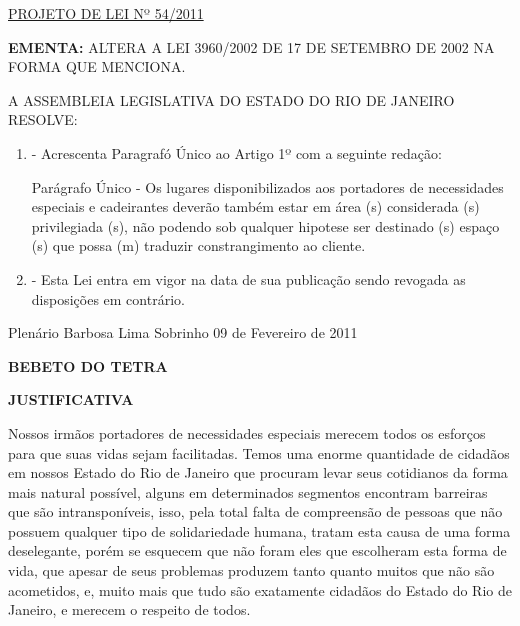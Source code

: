 \documentclass[10pt]{article}
\date{}
\begin{document}
\maketitle
\begin{center}
  \huge
  \vspace{-3cm}\href{http://alerjln1.alerj.rj.gov.br/scpro1115.nsf/f4b46b3cdbba990083256cc900746cf6/2ba323942b234b2f8325783200527358?OpenDocument}{PROJETO DE LEI Nº 54/2011}
\bigskip
\bigskip
\bigskip
  
\end{center}

\textbf{EMENTA:} 
ALTERA A LEI 3960/2002 DE 17 DE SETEMBRO DE 2002 NA FORMA QUE MENCIONA.








\bigskip

\noindent
A ASSEMBLEIA LEGISLATIVA DO ESTADO DO RIO DE JANEIRO RESOLVE:

\begin{enumerate}[label=Art. \arabic*\textdegree]
\item - Acrescenta Paragrafó Único ao Artigo 1º com a seguinte redação:

  Parágrafo Único - Os lugares disponibilizados aos portadores de necessidades especiais e cadeirantes deverão  também estar em área (s) considerada (s) privilegiada (s), não podendo sob qualquer hipotese ser destinado (s) espaço (s) que possa (m) traduzir constrangimento ao cliente.

\item - Esta Lei entra em vigor na data de sua publicação sendo revogada as disposições em contrário.


\end{enumerate}




\begin{center}
  Plenário Barbosa Lima Sobrinho 09 de   Fevereiro de 2011

   \bigskip

  \textbf{ BEBETO DO TETRA}

  \bigskip

  \textbf{JUSTIFICATIVA}
  \bigskip

\end{center}

  Nossos irmãos portadores de necessidades especiais merecem todos os esforços para que suas vidas sejam facilitadas. Temos uma enorme quantidade de cidadãos em nossos Estado do Rio de Janeiro que procuram levar seus cotidianos da forma mais natural possível, alguns em determinados segmentos encontram barreiras que são intransponíveis, isso, pela total falta de compreensão de pessoas que não possuem qualquer tipo de solidariedade humana, tratam esta causa de uma forma deselegante, porém se esquecem que não foram eles que escolheram esta forma de vida, que apesar de seus problemas produzem tanto quanto muitos que não são acometidos, e, muito mais que tudo são exatamente cidadãos do Estado do Rio de Janeiro, e merecem o respeito de todos. 



\iffalse
\begin{center}
  \textbf{REFERÊNCIAS}
\end{center}


\fi
\end{document}
